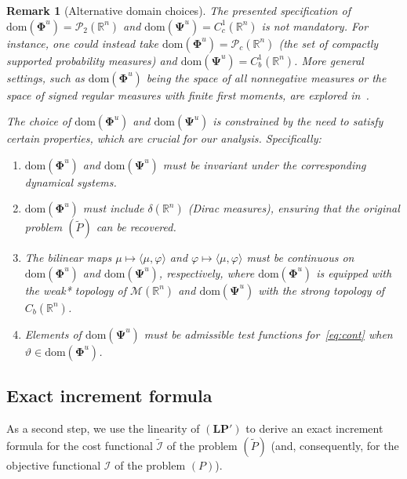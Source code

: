 \documentclass[sn-mathphys-num]{sn-jnl}
\numberwithin{equation}{section}
\theoremstyle{mythm}
\theoremstyle{mydef}
\newtheorem{remark}[proposition]{Remark}
\renewcommand{\phi}{\varphi}
\renewcommand{\mathbf}[1]{\bm{#1}}
\newcommand{\dom}{\mathrm{dom}}
\begin{document}
\begin{remark}[Alternative domain choices]
The presented specification of \( \dom(\bm \Phi^{u}) = \mathcal{P}_2(\mathbb{R}^n) \) and \( \dom(\bm \Psi^{u}) = C^1_c(\mathbb{R}^n) \) is not mandatory. For instance, one could instead take \( \dom(\bm \Phi^{u}) = \mathcal{P}_c(\mathbb{R}^n) \) (the set of compactly supported probability measures) and \( \dom(\bm \Psi^{u}) = C^1_b(\mathbb{R}^n) \). More general settings, such as \( \dom(\bm \Phi^{u}) \) being the space of all nonnegative measures or the space of signed regular measures with finite first moments, are explored in~\cite{BOGACHEV20153854,rippa2012,pogodaevNonlocalBalanceEquations2022}. 

The choice of \( \dom(\bm \Phi^{u}) \) and \( \dom(\bm \Psi^{u}) \) is constrained by the need to satisfy certain properties, which are crucial for our analysis. Specifically:
\begin{enumerate}
    \item \( \dom(\bm \Phi^{u}) \) and \( \dom(\bm \Psi^{u}) \) must be invariant under the corresponding dynamical systems.
    \item \( \dom(\bm \Phi^{u}) \) must include \( \delta(\mathbb{R}^n) \) (Dirac measures), ensuring that the original problem \( (\widetilde{P}) \) can be recovered.
    \item The bilinear maps \( \mu \mapsto \langle \mu, \phi \rangle \) and \( \phi \mapsto \langle \mu, \phi \rangle \) must be continuous on \( \dom(\bm \Phi^{u}) \) and \( \dom(\bm \Psi^{u}) \), respectively, where \( \dom(\bm \Phi^{u}) \) is equipped with the weak* topology of \( \mathcal{M}(\mathbb{R}^n) \) and \( \dom(\bm \Psi^{u}) \) with the strong topology of \( C_b(\mathbb{R}^n) \).
    \item Elements of \( \dom(\bm \Psi^{u}) \) must be admissible test functions for~\eqref{eq:cont} when \( \vartheta \in \dom(\bm \Phi^{u}) \).
\end{enumerate}
\end{remark}

\subsection{Exact increment formula}
\label{subsec:ee_simple}


As a second step, we use the linearity of $(\mathbf{LP}')$ to derive an exact increment formula for the cost functional $\widetilde{\mathcal{I}}$ of the problem $(\widetilde{P})$ (and, consequently, for the objective functional $\mathcal I$ of the problem $(P)$).
\end{document}
